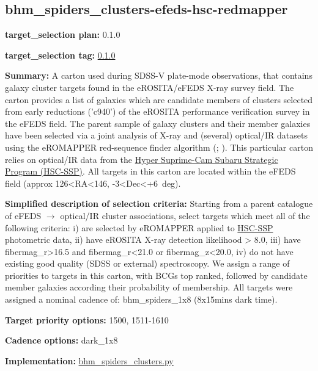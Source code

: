 \hypertarget{bhm_spiders_clusters-efeds-hsc-redmapper_plan0.1.0}{%
\subsection{bhm\_spiders\_clusters-efeds-hsc-redmapper}\label{bhm_spiders_clusters-efeds-hsc-redmapper_plan0.1.0}}

\noindent\textbf{target\_selection plan:} 0.1.0

\noindent\textbf{target\_selection tag:}
\href{https://github.com/sdss/target_selection/tree/0.1.0/}{0.1.0}

\noindent\textbf{Summary:} A carton used during SDSS-V plate-mode observations,
that contains galaxy cluster targets found in the eROSITA/eFEDS X-ray
survey field. The carton provides a list of galaxies which are candidate
members of clusters selected from early reductions ('c940') of the
eROSITA performance verification survey in the eFEDS field. The parent
sample of galaxy clusters and their member galaxies have been selected
via a joint analysis of X-ray and (several) optical/IR datasets using
the eROMAPPER red-sequence finder algorithm
(\citealt{Rykoff2014};
\citealt{IderChitham2020}). This particular carton relies on optical/IR data
from the \href{https://hsc.mtk.nao.ac.jp/ssp/}{Hyper Suprime-Cam Subaru
Strategic Program (HSC-SSP)}. All targets in this carton are located
within the eFEDS field (approx 126\textless RA\textless146,
-3\textless Dec\textless+6~deg).

\noindent\textbf{Simplified description of selection criteria:} Starting from a
parent catalogue of eFEDS $\rightarrow$ optical/IR cluster associations, select
targets which meet all of the following criteria: i) are selected by
eROMAPPER applied to \href{https://hsc.mtk.nao.ac.jp/ssp/}{HSC-SSP}
photometric data, ii) have eROSITA X-ray detection likelihood
\textgreater{} 8.0, iii) have fibermag\_r\textgreater16.5 and
fibermag\_r\textless21.0 or fibermag\_z\textless20.0, iv) do not have
existing good quality (SDSS or external) spectroscopy. We assign a range
of priorities to targets in this carton, with BCGs top ranked, followed
by candidate member galaxies according their probability of membership.
All targets were assigned a nominal cadence of: bhm\_spiders\_1x8
(8x15mins dark time).


\noindent\textbf{Target priority options:} 1500, 1511-1610

\noindent\textbf{Cadence options:} dark\_1x8

\noindent\textbf{Implementation:}
\href{https://github.com/sdss/target_selection/blob/0.1.0/python/target_selection/cartons/bhm_spiders_clusters.py}{bhm\_spiders\_clusters.py}

